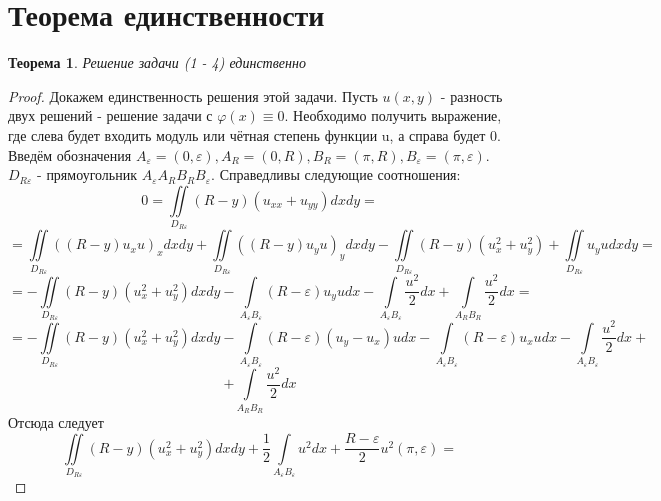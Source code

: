 \documentclass[a4paper, 11pt]{article}
\newtheorem{theorem}{Теорема}
\begin{document}
\section{Теорема единственности}
\begin{theorem}
	Решение задачи (1 - 4) единственно
\end{theorem}
\begin{proof}
		Докажем единственность решения этой задачи. Пусть $u(x,y)$ - разность двух решений - решение задачи с $\varphi(x) \equiv 0$. Необходимо получить выражение, где слева будет входить модуль или чётная степень функции u, а справа будет 0.\newline
	Введём обозначения $A_\varepsilon = (0, \varepsilon), A_R = (0, R), B_R = (\pi, R), B_\varepsilon = (\pi, \varepsilon)$. $D_{R\varepsilon}$ - прямоугольник $A_\varepsilon A_R B_R B_\varepsilon$. Справедливы следующие соотношения:
	\begin{equation*}
		0 = \iint\limits_{D_{R\varepsilon}} (R-y) (u_{xx} + u_{yy}) dx dy = 
	\end{equation*}
	\begin{equation*}
		=	\iint\limits_{D_{R\varepsilon}} \left( \left(R - y\right) u_x u\right)_x dx dy  + \iint\limits_{D_{R\varepsilon}} \left( \left(R - y\right) u_y u\right)_y dx dy  
		- \iint\limits_{D_{R\varepsilon}} \left(R- y\right) \left(u_x^2 + u_y^2\right) + \iint\limits_{D_{R\varepsilon}} u_y u dx dy = 
	\end{equation*}
	\begin{equation*}
		= - \iint\limits_{D_{R\varepsilon}} \left(R - y\right) \left(u_x^2 + u_y^2\right) dx dy
		- \int\limits_{A_\varepsilon B_\varepsilon} \left(R - \varepsilon\right) u_y u dx 
		-\int\limits_{A_\varepsilon B_\varepsilon} \dfrac{u^2}{2} dx + \int\limits_{A_R B_R} \dfrac{u^2}{2} dx = 
	\end{equation*}
	\begin{equation*}
		= - \iint\limits_{D_{R\varepsilon}} \left(R - y\right) \left(u_x^2 + u_y^2\right) dx dy - 
		\int\limits_{A_\varepsilon B_\varepsilon} \left(R - \varepsilon \right) \left(u_y - u_x\right)u dx - \int\limits_{A_\varepsilon B_\varepsilon} \left(R - \varepsilon\right) u_x u dx - \int\limits_{A_\varepsilon B_\varepsilon}\dfrac{u^2}{2} dx +
	\end{equation*}
	\begin{equation*}
		+ \int\limits_{A_R B_R} \dfrac{u^2}{2}dx
	\end{equation*}
	Отсюда следует
	\begin{equation*}
		\iint\limits_{D_{R\varepsilon}} \left(R - y\right) \left(u_x^2 + u_y^2\right) dx dy + \dfrac{1}{2}\int\limits_{A_\varepsilon B_\varepsilon} u^2 dx +\dfrac{R - \varepsilon}{2}u^2(\pi, \varepsilon)  =

\end{equation*}
\end{proof}
\end{document}
